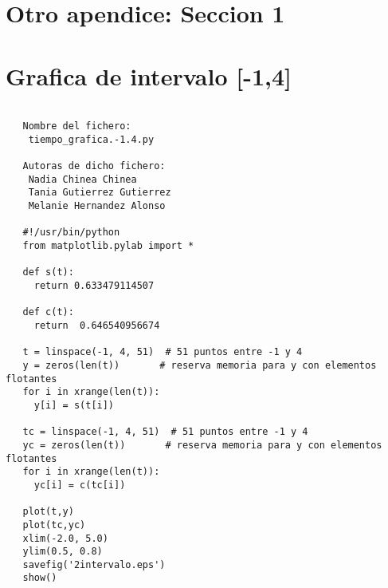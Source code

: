 \section{Otro apendice: Seccion 1}
\label{Apendice2:label}


\section{Grafica de intervalo [-1,4]}
\label{sec6}
\begin{center}
\begin{footnotesize}
\begin{verbatim}
   
   Nombre del fichero:
    tiempo_grafica.-1.4.py

   Autoras de dicho fichero:
    Nadia Chinea Chinea 
    Tania Gutierrez Gutierrez 
    Melanie Hernandez Alonso

   #!/usr/bin/python
   from matplotlib.pylab import *

   def s(t):
     return 0.633479114507

   def c(t):
     return  0.646540956674

   t = linspace(-1, 4, 51)  # 51 puntos entre -1 y 4
   y = zeros(len(t))       # reserva memoria para y con elementos flotantes
   for i in xrange(len(t)):
     y[i] = s(t[i])

   tc = linspace(-1, 4, 51)  # 51 puntos entre -1 y 4
   yc = zeros(len(t))       # reserva memoria para y con elementos flotantes
   for i in xrange(len(t)):
     yc[i] = c(tc[i])

   plot(t,y)
   plot(tc,yc)
   xlim(-2.0, 5.0)
   ylim(0.5, 0.8)
   savefig('2intervalo.eps')
   show()
   
\end{verbatim}
\end{footnotesize}
\end{center}


